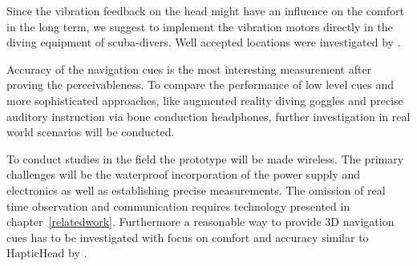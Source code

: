 Since the vibration feedback on the head might have an influence on the comfort in the long term, we suggest to implement the vibration motors directly in the diving equipment of scuba-divers.
Well accepted locations were investigated by \cite{Kiss:2018:NSM:3173574.3174191}.

Accuracy of the navigation cues is the most interesting measurement after proving the perceivableness.
To compare the performance of low level cues and more sophisticated approaches, like augmented reality diving goggles and precise auditory instruction via bone conduction headphones, further investigation in real world scenarios will be conducted.

To conduct studies in the field the prototype will be made wireless.
The primary challenges will be the waterproof incorporation of the power supply and electronics as well as establishing precise measurements.
The omission of real time observation and communication requires technology presented in chapter~\ref{relatedwork}.
Furthermore a reasonable way to provide 3D navigation cues has to be investigated with focus on comfort and accuracy similar to HapticHead by \cite{Kaul_HapticHead}.


